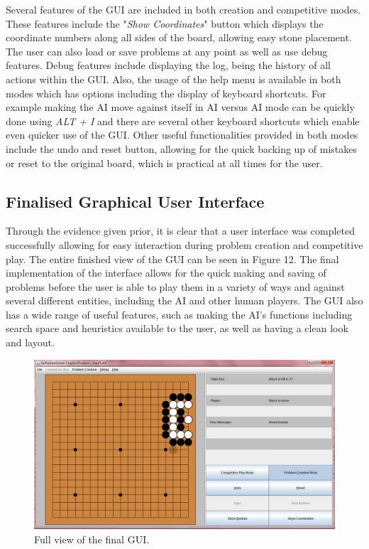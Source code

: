 \documentclass{l3proj}
\begin{document}
Several features of the GUI are included in both creation and competitive modes. These features include the "\textit{Show Coordinates}" button which displays the coordinate numbers along all sides of the board, allowing easy stone placement. The user can also load or save problems at any point as well as use debug features. Debug features include displaying the log, being the history of all actions within the GUI. Also, the usage of the help menu is available in both modes which has options including the display of keyboard shortcuts. For example making the AI move against itself in AI versus AI mode can be quickly done using \textit{ALT + I} and there are several other keyboard shortcuts which enable even quicker use of the GUI. Other useful functionalities provided in both modes include the undo and reset button, allowing for the quick backing up of mistakes or reset to the original board, which is practical at all times for the user.

\subsection{Finalised Graphical User Interface}

Through the evidence given prior, it is clear that a user interface was completed successfully allowing for easy interaction during problem creation and competitive play. The entire finished view of the GUI can be seen in Figure 12. The final implementation of the interface allows for the quick making and saving of problems before the user is able to play them in a variety of ways and against several different entities, including the AI and other human players. The GUI also has a wide range of useful features, such as making the AI's functions including  search space and heuristics available to the user, as well as having a clean look and layout.

\begin{figure}[H]
\centering
\includegraphics[scale=0.5]{Images/GUI-13-FullView.png}
\caption{Full view of the final GUI.}
\end{figure}
\end{document}
